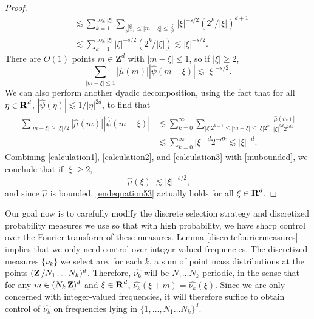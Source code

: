 \begin{proof}
\begin{equation}
\begin{split}
        &\lesssim \sum_{k = 1}^{\log |\xi|} \sum_{\frac{|\xi|}{2^{k+1}} \leq |m - \xi| \leq \frac{|\xi|}{2^{k}}} |\xi|^{-s/2} \left( 2^k/|\xi| \right)^{d+1}\\
        &\lesssim \sum_{k = 1}^{\log |\xi|} |\xi|^{-s/2} (2^k / |\xi| ) \lesssim |\xi|^{-s/2}.
    \end{split}
    \end{equation}
    There are $O(1)$ points $m \in \mathbf{Z}^d$ with $|m - \xi| \leq 1$, so if $|\xi| \geq 2$,
    \begin{equation} \label{calculation2}
        \sum_{|m - \xi| \leq 1} |\widehat{\mu}(m)| |\widehat{\psi}(m - \xi)| \lesssim |\xi|^{-s/2}.
    \end{equation}
    We can also perform another dyadic decomposition, using the fact that for all $\eta \in \operatorname{\mathbf{R}}^d$, $|\widehat{\psi}(\eta)| \lesssim 1/|\eta|^{2d}$, to find that
    \begin{equation} \label{calculation3}
    \begin{split}
        \sum_{|m - \xi| \geq |\xi|/2} |\widehat{\mu}(m)| |\widehat{\psi}(m - \xi)| &\lesssim \sum_{k = 0}^\infty \sum_{|\xi| 2^{k-1} \leq |m - \xi| \leq |\xi| 2^k} \frac{|\widehat{\mu}(m)|}{|\xi|^{2d} 2^{2dk}}\\
        &\lesssim \sum_{k = 0}^\infty |\xi|^{-d} 2^{-dk} \lesssim |\xi|^{-d}.
    \end{split}
    \end{equation}
    Combining \eqref{calculation1}, \eqref{calculation2}, and \eqref{calculation3} with \eqref{mubounded}, we conclude that if $|\xi| \geq 2$,
    \begin{equation} \label{endequation53}
        |\widehat{\mu}(\xi)| \lesssim |\xi|^{-s/2},
    \end{equation}
    and since $\widehat{\mu}$ is bounded, \eqref{endequation53} actually holds for all $\xi \in \operatorname{\mathbf{R}}^d$.
\end{proof}

Our goal now is to carefully modify the discrete selection strategy and discretized probability measures we use so that with high probability, we have sharp control over the Fourier transform of these measures. Lemma \ref{discretefouriermeasures} implies that we only need control over integer-valued frequencies. The discretized measures $\{ \nu_k \}$ we select are, for each $k$, a sum of point mass distributions at the points $(\operatorname{\mathbf{Z}}/N_1 \dots N_k)^d$. Therefore, $\widehat{\nu_k}$ will be $N_1 \dots N_k$ periodic, in the sense that for any $m \in (N_k \operatorname{\mathbf{Z}})^d$ and $\xi \in \operatorname{\mathbf{R}}^d$, $\widehat{\nu_k}(\xi + m) = \widehat{\nu_k}(\xi)$. Since we are only concerned with integer-valued frequencies, it will therefore suffice to obtain control of $\widehat{\nu_k}$ on frequencies lying in $\{ 1, \dots, N_1 \dots N_k \}^d$.

